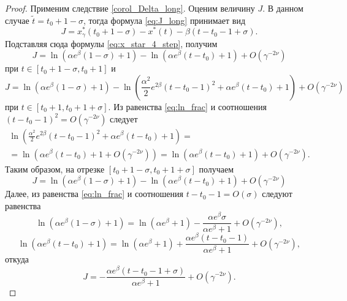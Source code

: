 \begin{proof}

Применим следствие \ref{corol_Delta_long}. Оценим величину $J$. В данном случае $\tilde{t} = t_0 + 1 - \sigma$, тогда формула \eqref{eq:J_long} принимает вид
%
\[
J = x_\gamma^*(t_0 + 1 - \sigma) - x^*(t) - \beta(t - t_0 - 1 + \sigma).
\]
%
Подставляя сюда формулы \eqref{eq:x_star_4_step}, получим
%
\[
	J = \ln(\alpha e^{\beta} (1 - \sigma) + 1) - \ln(\alpha e^{\beta}(t - t_0) + 1) + O(\gamma^{-2\nu})
\]
при $t\in [t_0 + 1 - \sigma, t_0 + 1]$ и
%
\[
	J = \ln(\alpha e^{\beta} (1 - \sigma) + 1) - \ln \left(\frac{\alpha^2}{2}e^{2\beta}(t-t_0-1)^2  + \alpha e^{\beta}(t-t_0)+1 \right) + O(\gamma^{-2\nu})
\]
при $t\in [t_0+1,t_0+1+\sigma].$
%
Из равенства \eqref{eq:ln_frac} и соотношения $(t - t_0 - 1)^2 = O(\gamma^{-2\nu})$ следует
\begin{multline*}
\ln \left(\frac{\alpha^2}{2} e^{2\beta} (t - t_0 - 1)^2  + \alpha e^{\beta}(t - t_0) + 1 \right) =\\= \ln (\alpha e^{\beta}(t - t_0) + 1 + O(\gamma^{-2\nu})) = \ln (\alpha e^{\beta}(t - t_0) + 1) + O(\gamma^{-2\nu}).
\end{multline*}
%
Таким образом, на отрезке $[t_0 + 1 - \sigma, t_0 + 1 + \sigma]$ получаем
%
\[
J = \ln(\alpha e^{\beta} (1 - \sigma) + 1) - \ln(\alpha e^{\beta}(t - t_0) + 1) + O(\gamma^{-2\nu})
\]
%
Далее, из равенства \eqref{eq:ln_frac} и соотношения $t - t_0 - 1 = O(\sigma)$ следуют равенства
\[
 \ln(\alpha e^{\beta} (1 - \sigma) + 1) = \ln(\alpha e^{\beta} + 1) - \frac{\alpha e^{\beta}\sigma}{\alpha e^{\beta} + 1} + O(\gamma^{-2\nu}),
\]
\[
\ln(\alpha e^{\beta} (t - t_0) + 1) = \ln(\alpha e^{\beta} + 1) + \frac{\alpha e^{\beta} (t - t_0 - 1)}{\alpha e^{\beta} + 1} + O(\gamma^{-2\nu}),
\]
откуда
\begin{equation}
\label{eq:J_step4}
J = -\frac{\alpha e^{\beta} (t - t_0 - 1 + \sigma)}{\alpha e^{\beta} + 1} + O(\gamma^{-2\nu}).
\end{equation}


\end{proof}
